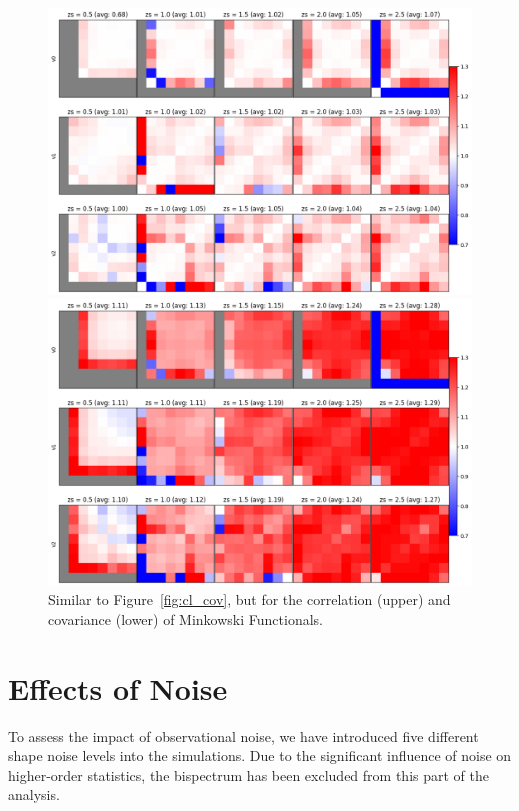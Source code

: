 \begin{figure}[p]
    \centering
    \includegraphics[width=\textwidth]{figures/results/mfs_corr.png}
    \caption[Minkowski Functionals Correlation and Covariance]{Similar to Figure~\ref{fig:cl_cov}, but for the correlation (upper) and covariance (lower) of Minkowski Functionals.}
    \label{fig:mfs_cov}
    \vspace{0.5cm}
    \includegraphics[width=\textwidth]{figures/results/mfs_cov.png}
\end{figure}

\section{Effects of Noise}
To assess the impact of observational noise, we have introduced five different shape noise levels into the simulations. Due to the significant influence of noise on higher-order statistics, the bispectrum has been excluded from this part of the analysis.

